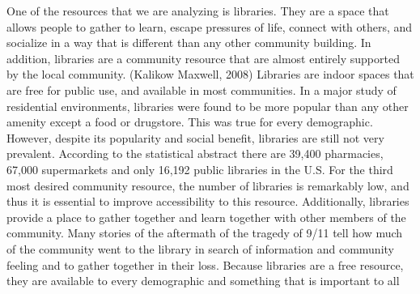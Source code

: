 \documentclass[3p, authoryear]{elsarticle} %
\begin{document}
One of the resources that we are analyzing is libraries. They are a space that
allows people to gather to learn, escape pressures of life, connect with others,
and socialize in a way that is different than any other community building. In
addition, libraries are a community resource that are almost entirely supported
by the local community. (Kalikow Maxwell, 2008) Libraries are indoor spaces that
are free for public use, and available in most communities. In a major study of
residential environments, libraries were found to be more popular than any other
amenity except a food or drugstore. This was true for every demographic.
However, despite its popularity and social benefit, libraries are still not very
prevalent. According to the statistical abstract there are 39,400 pharmacies,
67,000 supermarkets and only 16,192 public libraries in the U.S. For the third
most desired community resource, the number of libraries is remarkably low, and
thus it is essential to improve accessibility to this resource. Additionally,
libraries provide a place to gather together and learn together with other
members of the community. Many stories of the aftermath of the tragedy of 9/11
tell how much of the community went to the library in search of information and
community feeling and to gather together in their loss. Because libraries are a
free resource, they are available to every demographic and something that is
important to all \citep{barclay2017space}
\end{document}
